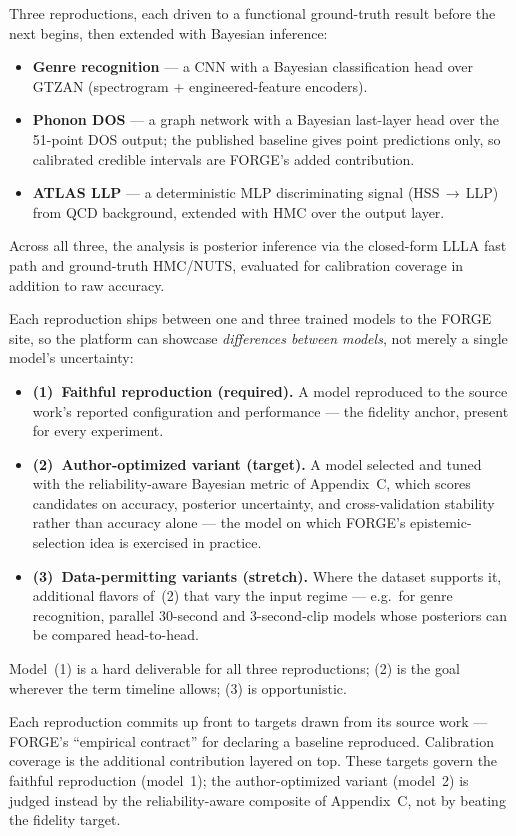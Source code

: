 Three reproductions, each driven to a functional ground-truth result before the next begins, then extended with Bayesian inference:
\begin{itemize}[nosep,leftmargin=1.4em]
  \item \textbf{Genre recognition} --- a CNN with a Bayesian classification head over GTZAN (spectrogram + engineered-feature encoders).
  \item \textbf{Phonon DOS} --- a graph network with a Bayesian last-layer head over the 51-point DOS output; the published baseline gives point predictions only, so calibrated credible intervals are FORGE's added contribution.
  \item \textbf{ATLAS LLP} --- a deterministic MLP discriminating signal (HSS\,$\rightarrow$\,LLP) from QCD background, extended with HMC over the output layer.
\end{itemize}
Across all three, the analysis is posterior inference via the closed-form LLLA fast path and ground-truth HMC/NUTS, evaluated for calibration coverage in addition to raw accuracy.

Each reproduction ships between one and three trained models to the FORGE site, so the platform can showcase \emph{differences between models}, not merely a single model's uncertainty:
\begin{itemize}[nosep,leftmargin=1.4em]
  \item \textbf{(1)~Faithful reproduction (required).} A model reproduced to the source work's reported configuration and performance --- the fidelity anchor, present for every experiment.
  \item \textbf{(2)~Author-optimized variant (target).} A model selected and tuned with the reliability-aware Bayesian metric of Appendix~C, which scores candidates on accuracy, posterior uncertainty, and cross-validation stability rather than accuracy alone --- the model on which FORGE's epistemic-selection idea is exercised in practice.
  \item \textbf{(3)~Data-permitting variants (stretch).} Where the dataset supports it, additional flavors of~(2) that vary the input regime --- e.g.\ for genre recognition, parallel 30-second and 3-second-clip models whose posteriors can be compared head-to-head.
\end{itemize}
Model~(1) is a hard deliverable for all three reproductions; (2) is the goal wherever the term timeline allows; (3) is opportunistic.

Each reproduction commits up front to targets drawn from its source work --- FORGE's ``empirical contract'' for declaring a baseline reproduced. Calibration coverage is the additional contribution layered on top. These targets govern the faithful reproduction (model~1); the author-optimized variant (model~2) is judged instead by the reliability-aware composite of Appendix~C, not by beating the fidelity target.

